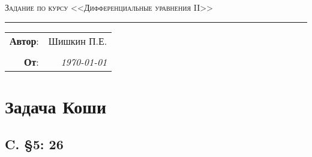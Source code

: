\documentclass{article}
\begin{document}
\begin{center}
    \LARGE \textsc{Задание по курсу <<Дифференциальные уравнения II>>}
\end{center}

\hrule

\phantom{42}

\begin{flushright}
    \begin{tabular}{rr}
        \textbf{Автор}: 
        & Шишкин П.Е. \\
        &\\
        \textbf{От}: &
        \textit{\today}\\
    \end{tabular}
\end{flushright}

\thispagestyle{empty}
\tableofcontents
\newpage



\section{Задача Коши}
\subsection{C. \S5: 26}
\end{document}
